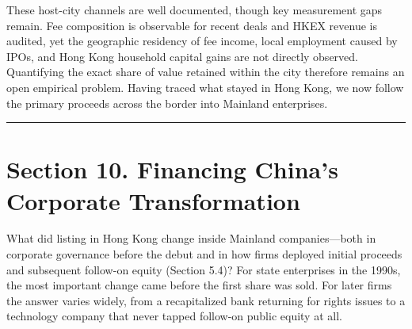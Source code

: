 \documentclass[11pt,letterpaper]{article}
\begin{document}
These host-city channels are well documented, though key measurement gaps remain. Fee composition is observable for recent deals and HKEX revenue is audited, yet the geographic residency of fee income, local employment caused by IPOs, and Hong Kong household capital gains are not directly observed. Quantifying the exact share of value retained within the city therefore remains an open empirical problem. Having traced what stayed in Hong Kong, we now follow the primary proceeds across the border into Mainland enterprises.

\par\medskip\noindent\rule{\linewidth}{0.35pt}\par\medskip
\section*{\texorpdfstring{Section 10. Financing China's Corporate Transformation}{Section 10. Financing China's Corporate Transformation}}
What did listing in Hong Kong change inside Mainland companies—both in corporate governance before the debut and in how firms deployed initial proceeds and subsequent follow-on equity (Section 5.4)? For state enterprises in the 1990s, the most important change came before the first share was sold. For later firms the answer varies widely, from a recapitalized bank returning for rights issues to a technology company that never tapped follow-on public equity at all.
\end{document}
